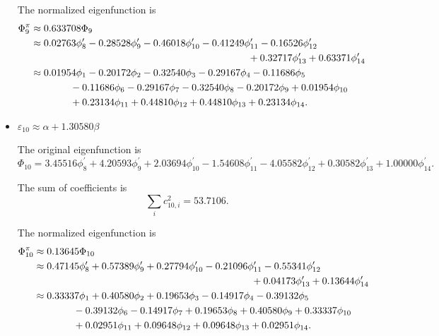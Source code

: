 \begin{itemize}
		The normalized eigenfunction is		
		\begin{align}
			\Phi^\pi_9 &\approx 0.633708 \Phi_9 \notag \\
			&\approx 0.02763 \phi^\prime_8 - 0.28528 \phi^\prime_9 -0.46018 \phi^\prime_{10} -0.41249 \phi^\prime_{11} -0.16526 \phi^\prime_{12}  \notag\\
			&\hspace*{22em} + 0.32717 \phi^\prime_{13} + 0.63371 \phi^\prime_{14} \notag \\
			&\approx 0.01954 \phi_1 -0.20172 \phi_2 - 0.32540 \phi_3 -0.29167 \phi_4 -0.11686 \phi_5  \notag \\
			&\hspace*{4em} -0.11686 \phi_6 -0.29167 \phi_7 -0.32540\phi_8 -0.20172 \phi_9  +0.01954 \phi_{10} \notag \\
			&\hspace*{4em} +0.23134 \phi_{11} + 0.44810 \phi_{12} + 0.44810 \phi_{13} + 0.23134 \phi_{14} .
		\end{align}
		
		
		\item $\varepsilon_{10} \approx \alpha + 1.30580 \beta$
		
		The original eigenfunction is
		\begin{equation*}
			\Phi_{10} =  3.45516 \phi^\prime_8 + 4.20593 \phi^\prime_9 + 2.03694  \phi^\prime_{10} -1.54608 \phi^\prime_{11}   -4.05582 \phi^\prime_{12} + 0.30582 \phi^\prime_{13} +1.00000 \phi^\prime_{14}.
		\end{equation*}
		
		The sum of coefficients is
		\begin{equation*}
			\sum_{i} c^2_{10,i} =  53.7106.
		\end{equation*}
		
		The normalized eigenfunction is		
		\begin{align}
			\Phi^\pi_{10} &\approx 0.13645 \Phi_{10} \notag \\
			&\approx 0.47145 \phi^\prime_8 + 0.57389 \phi^\prime_9 + 0.27794 \phi^\prime_{10} -0.21096 \phi^\prime_{11} -0.55341 \phi^\prime_{12}  \notag\\
			&\hspace*{22em} + 0.04173 \phi^\prime_{13} + 0.13644 \phi^\prime_{14} \notag \\
			&\approx 0.33337 \phi_1 + 0.40580 \phi_2 + 0.19653  \phi_3 -0.14917 \phi_4  -0.39132 \phi_5  \notag \\
			&\hspace*{4em}  -0.39132 \phi_6  -0.14917 \phi_7 + 0.19653  \phi_8  + 0.40580 \phi_9  + 0.33337 \phi_{10} \notag \\
			&\hspace*{4em} +0.02951 \phi_{11} +0.09648  \phi_{12}  +0.09648 \phi_{13} + 0.02951 \phi_{14} .
		\end{align}
		

\end{itemize}
